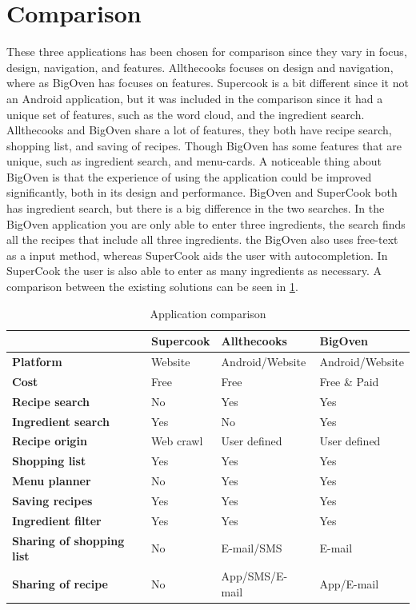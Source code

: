 \section{Comparison}
These three applications has been chosen for comparison since they vary in focus, design, navigation, and features. Allthecooks focuses on design and navigation, where as BigOven has focuses on features. Supercook is a bit different since it not an Android application, but it was included in the comparison since it had a unique set of features, such as the word cloud, and the ingredient search.
Allthecooks and BigOven share a lot of features, they both have recipe search, shopping list, and saving of recipes. Though BigOven has some features that are unique, such as ingredient search, and menu-cards. A noticeable thing about BigOven is that the experience of using the application could be improved significantly, both in its design and performance.
BigOven and SuperCook both has ingredient search, but there is a big difference in the two searches. In the BigOven application you are only able to enter three ingredients, the search finds all the recipes that include all three ingredients. the BigOven also uses free-text as a input method, whereas SuperCook aids the user with autocompletion. In SuperCook the user is also able to enter as many ingredients as necessary.
A comparison between the existing solutions can be seen in \ref{tab:appcomparison}.
\begin{table}[H]
\centering
\begin{tabular}{|l|l|l|l|}
\hline
 & \textbf{Supercook} & \textbf{Allthecooks} & \textbf{BigOven} \\
\hline
\textbf{Platform} & Website & Android/Website & Android/Website \\
\hline
\textbf{Cost} & Free & Free & Free \& Paid \\
\hline
\textbf{Recipe search} & No & Yes & Yes  \\
\hline
\textbf{Ingredient search} & Yes & No & Yes \\
\hline
\textbf{Recipe origin} & Web crawl & User defined & User defined \\
\hline
\textbf{Shopping list} & Yes & Yes & Yes \\
\hline
\textbf{Menu planner} & No & Yes & Yes \\
\hline
\textbf{Saving recipes} & Yes & Yes & Yes \\
\hline
\textbf{Ingredient filter} & Yes & Yes & Yes \\
\hline
\textbf{Sharing of shopping list} & No & E-mail/SMS & E-mail \\
\hline
\textbf{Sharing of recipe} & No & App/SMS/E-mail & App/E-mail \\
\hline
\end{tabular}
\caption{Application comparison}
\label{tab:appcomparison}
\end{table}

